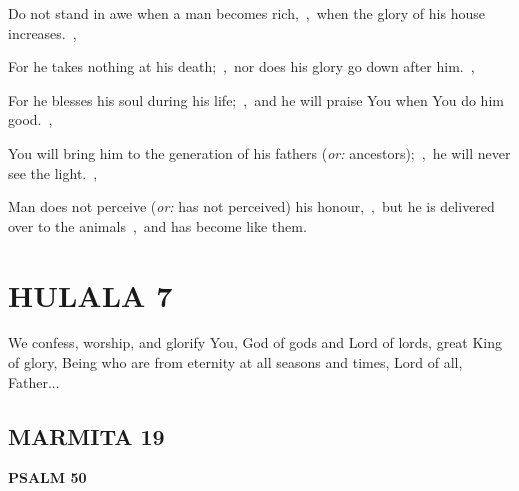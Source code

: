 \documentclass[12pt,twoside,a5paper]{article}
\newcommand{\hulala}[1]{\section*{HULALA {#1}}}
\newcommand{\marmita}[1]{\subsection*{MARMITA {#1}}}
\newcommand{\psalm}[1]{\textbf{PSALM {#1}}\nopagebreak}
\newcommand{\slota}[1]{\liturgicalhint{Slota.} #1}
\newcommand{\translationoption}[1]{\emph{or:} #1}
\begin{document}
\begin{normalparskip}
  Do not stand in awe when a man becomes rich,~\sep\ when the glory of his house increases.~\sep

  For he takes nothing at his death;~\sep\ nor does his glory go down after him.~\sep

  For he blesses his soul during his life;~\sep\ and he will praise You when You do him good.~\sep

  You will bring him to the generation of his fathers (\translationoption{ancestors});~\sep\ he will never see the light.~\sep

  Man does not perceive (\translationoption{has not perceived}) his honour,~\sep\ but he is delivered over to the animals~\sep\ and has become like them.
\end{normalparskip}


\hulala{7}

\slota{We confess, worship, and glorify You, God of gods and Lord of lords, great King of glory, Being who are from eternity at all seasons and times, Lord of all, Father...}

\marmita{19}

\psalm{50}
\end{document}

